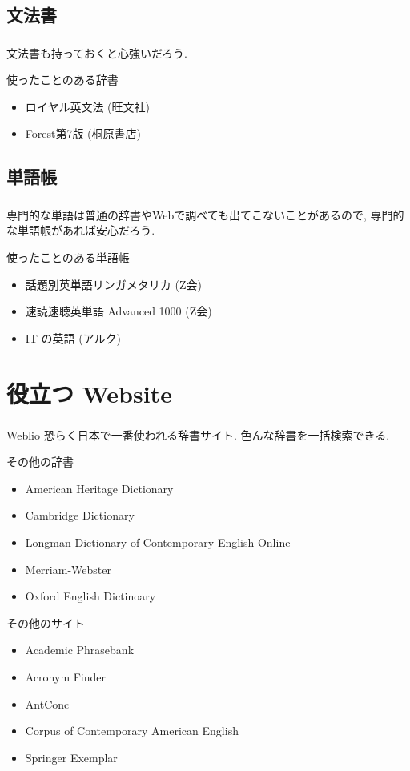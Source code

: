 \documentclass[dvipdfmx,10pt]{beamer}
\newcommand{\bb}{\begin{block}}
\newcommand{\eb}{\end{block}}
\begin{document}
\subsection{文法書}
\begin{frame}\frametitle{\insertsubsection}
文法書も持っておくと心強いだろう.
\begin{exampleblock}{使ったことのある辞書}
\begin{itemize}
\item ロイヤル英文法 (旺文社)
\item Forest第7版 (桐原書店) 
\end{itemize}
\end{exampleblock}
\end{frame}

\subsection{単語帳}
\begin{frame}\frametitle{\insertsubsection}
専門的な単語は普通の辞書やWebで調べても出てこないことがあるので, 専門的な単語帳があれば安心だろう.
\begin{exampleblock}{使ったことのある単語帳}
\begin{itemize}
\item 話題別英単語リンガメタリカ (Z会)
\item 速読速聴英単語 Advanced 1000 (Z会)
\item IT の英語 (アルク)
\end{itemize}
\end{exampleblock}
\end{frame}
\section{役立つ Website}
\begin{frame}\frametitle{\insertsection}
\footnotesize
\bb{Weblio}
恐らく日本で一番使われる辞書サイト. 色んな辞書を一括検索できる.
\eb
\begin{exampleblock}{その他の辞書}
\begin{itemize}
\item American Heritage Dictionary
\item Cambridge Dictionary
\item Longman Dictionary of Contemporary English Online
\item Merriam-Webster
\item Oxford English Dictinoary
\end{itemize}
\end{exampleblock}
\begin{exampleblock}{その他のサイト}
\begin{itemize}
\item Academic Phrasebank
\item Acronym Finder
\item AntConc
\item Corpus of Contemporary American English
\item Springer Exemplar
\end{itemize}
\end{exampleblock}

\normalsize
\end{frame}
\end{document}

